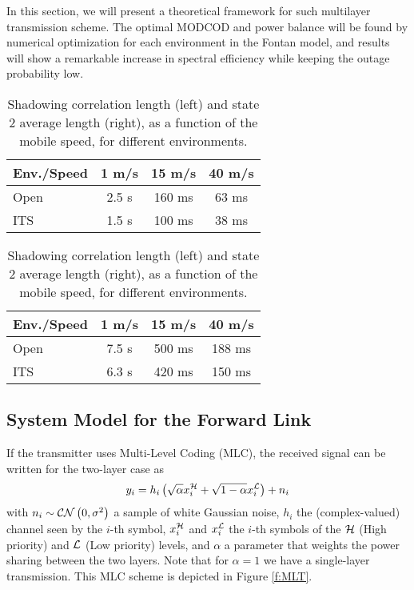 \documentclass[journal,onecolumn,10pt,a4paper]{IEEEtran}
\begin{document}
In this section, we will present a theoretical framework for such multilayer transmission scheme. The optimal MODCOD and power balance will be found by numerical optimization for each environment in the Fontan model, and results will show a remarkable increase in spectral efficiency while keeping the outage probability low.
\begin{table}
  \caption{Shadowing correlation length (left) and state 2 average length (right), as a function of the mobile speed, for different environments.}
  \label{tbl:sh_corr}

  \centering
  \begin{tabular}{|l | c | c | c |} \hline
Env./Speed & 1 m/s & 15 m/s & 40 m/s \\ \hline
Open	& 2.5 s & 160 ms & 63 ms \\ \hline
ITS	& 1.5 s & 100 ms & 38 ms \\ \hline

  \end{tabular}\hspace*{1cm}
  \begin{tabular}{|l | c | c | c |} \hline
Env./Speed & 1 m/s & 15 m/s & 40 m/s \\ \hline
Open	& 7.5 s & 500 ms & 188 ms \\ \hline
ITS	& 6.3 s & 420 ms & 150 ms \\ \hline

  \end{tabular}
\end{table}
 \newcommand{\doc}{report }
\newcommand{\Lalb}{{\cal L} }
\newcommand{\Halb}{{\cal H} }
\newcommand{\malb}[1]{\boldsymbol{\mathbf{#1}}}

\subsection{System Model for the Forward Link}

If the transmitter uses Multi-Level Coding (MLC), the received signal can be written for the two-layer case as
\begin{equation}
 y_i = h_i \left( \sqrt{\alpha} x_i^{\cal H} + \sqrt{1-\alpha} x_i^{\cal L} \right) + n_i 
\end{equation}
with $n_i \sim {\cal CN}\left( 0, \sigma^2\right)$ a sample of white Gaussian noise, $h_i$  the (complex-valued) channel seen by the $i$-th symbol, $x_i^\Halb$ and $x_i^{\cal L}$ the $i$-th symbols of the ${\cal H}$ (High priority) and ${\cal L}$ (Low priority) levels, and $\alpha$ a parameter that weights the power sharing between the two layers. Note that for $\alpha=1$ we have a single-layer transmission. This MLC scheme is depicted in Figure \ref{f:MLT}.
\end{document}
